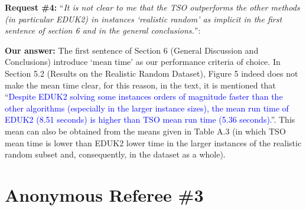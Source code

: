 \documentclass{elsarticle}
\begin{document}
\textbf{Request \#4:} ``\textit{It is not clear to me that the TSO outperforms the other methods (in particular EDUK2) in instances `realistic random' as implicit in the first sentence of section 6 and in the general conclusions.}'':

\textbf{Our answer:} The first sentence of Section 6 (General Discussion and Conclusions) introduce `mean time' as our performance criteria of choice. In Section 5.2 (Results on the Realistic Random Dataset), Figure 5 indeed does not make the mean time clear, for this reason, in the text, it is mentioned that ``\textcolor{blue}{Despite EDUK2 solving some instances orders of magnitude faster than the other algorithms (especially in the larger instance sizes), the mean run time of EDUK2 (8.51 seconds) is higher than TSO mean run time (5.36 seconds).}''. This mean can also be obtained from the means given in Table A.3 (in which TSO mean time is lower than EDUK2 lower time in the larger instances of the realistic random subset and, consequently, in the dataset as a whole).
\bigskip

\newpage
\section{Anonymous Referee \#3}
\end{document}
